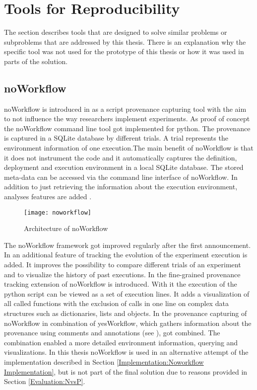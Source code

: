 \documentclass[draft,final]{vutinfth} %
\begin{document}
\section{Tools for Reproducibility}\label{Existing Tools}
The section describes tools that are designed to solve similar problems or subproblems that are addressed by this thesis. There is an explanation why the specific tool was not used for the prototype of this thesis or how it was used in parts of the solution. 

\subsection{noWorkflow}\label{Noworkflow}
noWorkflow is introduced in \cite{c9e0604becba42af96a9cb0a6f60018b} as a script provenance capturing tool with the aim to not influence the way researchers implement experiments. As proof of concept the noWorkflow command line tool got implemented for python. The provenance is captured in a SQLite database by different trials. A trial represents the environment information of one execution.The main benefit of noWorkflow is that it does not instrument the code and it automatically captures the definition, deployment and execution environment in a local SQLite database. The stored meta-data can be accessed via the command line interface of noWorkflow. In addition to just retrieving the information about the execution environment, analyses features are added \cite{c9e0604becba42af96a9cb0a6f60018b}.

\begin{figure}[h]
	\centering
	\texttt{[image: noworkflow]}
	\caption{Architecture of noWorkflow \cite{c9e0604becba42af96a9cb0a6f60018b}}
	\label{fig:noworkflow} %
\end{figure}

The noWorkflow framework got improved regularly after the first announcement. In \cite{Pimentel2016TrackingAA} an additional feature of tracking the evolution of the experiment execution is added. It improves the possibility to compare different trials of an experiment and to visualize the history of past executions. In \cite{Pimentel:2016:FPC:3090188.3090214} the fine-grained provenance tracking extension of noWorkflow is introduced. With it the execution of the python script can be viewed as a set of execution lines. It adds a visualization of all called functions with the exclusion of calls in one line on complex data structures such as dictionaries, lists and objects. In \cite{69bac1252a684629baa43b48e350068d} the provenance capturing of noWorkflow in combination of yesWorkflow, which gathers information about the provenance using comments and annotations (see \cite{192094}), got combined. The combination enabled a more detailed environment information, querying and visualizations. 
In this thesis noWorkflow is used in an alternative attempt of the implementation described in Section \ref{Implementation:Noworkflow Implementation}, but is not part of the final solution due to reasons provided in Section \ref{Evaluation:NvsP}.
\end{document}
